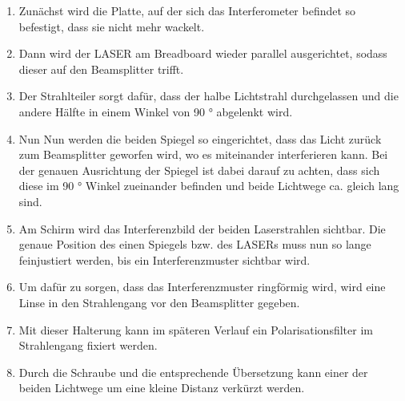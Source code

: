 \documentclass[12pt,english,ngerman]{scrartcl}
\begin{document}
\begin{enumerate}
	\item Zunächst wird die Platte, auf der sich das Interferometer befindet so
	      befestigt, dass sie nicht mehr wackelt.
	\item Dann wird der LASER am Breadboard wieder parallel ausgerichtet, sodass dieser
	      auf den Beamsplitter trifft.
	\item Der Strahlteiler sorgt dafür, dass der halbe Lichtstrahl durchgelassen und die
	      andere Hälfte in einem Winkel von 90 ° abgelenkt wird.
	\item Nun Nun werden die beiden Spiegel so eingerichtet, dass das Licht zurück zum
	      Beamsplitter geworfen wird, wo es miteinander interferieren kann. Bei der
	      genauen Ausrichtung der Spiegel ist dabei darauf zu achten, dass sich diese im
	      90 ° Winkel zueinander befinden und beide Lichtwege ca. gleich lang sind.
	\item Am Schirm wird das Interferenzbild der beiden Laserstrahlen sichtbar. Die
	      genaue Position des einen Spiegels bzw. des LASERs muss nun so lange
	      feinjustiert werden, bis ein Interferenzmuster sichtbar wird.
	\item Um dafür zu sorgen, dass das Interferenzmuster ringförmig wird, wird eine Linse
	      in den Strahlengang vor den Beamsplitter gegeben.
	\item Mit dieser Halterung kann im späteren Verlauf ein Polarisationsfilter im
	      Strahlengang fixiert werden.
	\item Durch die Schraube und die entsprechende Übersetzung kann einer der beiden
	      Lichtwege um eine kleine Distanz verkürzt werden.
\end{enumerate}
\end{document}
